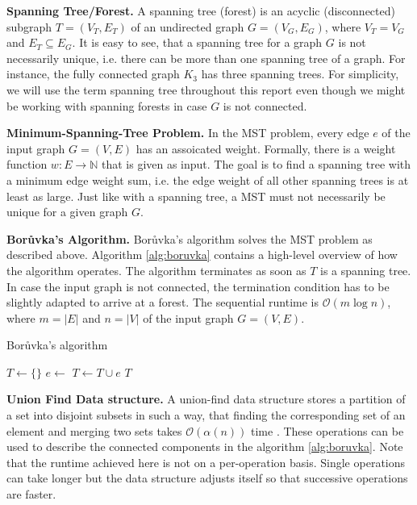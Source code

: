 \documentclass[letterpaper]{article}
\newcommand{\N}[0]{\mathbb{N}}
\newcommand{\bigoh}{\mathcal O}
\newcommand{\mypar}[1]{{\bf #1.}}
\begin{document}
\mypar{Spanning Tree/Forest}
A spanning tree (forest) is an acyclic (disconnected) subgraph $T = (V_T, E_T)$ of an undirected graph $G = (V_G, E_G)$,
where $V_T = V_G$ and $E_T \subseteq E_G$. It is easy to see, that a spanning tree for a graph $G$ is not necessarily
unique, i.e. there can be more than one spanning tree of a graph. For instance, the fully connected graph $K_3$ has
three spanning trees. For simplicity, we will use the term spanning tree throughout this report even though we might be
working with spanning forests in case $G$ is not connected.

\mypar{Minimum-Spanning-Tree Problem}
In the MST problem, every edge $e$ of the input graph $G = (V, E)$ has an assoicated weight. Formally, there is a weight
function $w : E \to \N$ that is given as input. The goal is to find a spanning tree with a minimum edge weight sum, i.e.
the edge weight of all other spanning trees is at least as large. Just like with a spanning tree, a MST must not
necessarily be unique for a given graph $G$.

\mypar{Bor\r{u}vka's Algorithm}
Bor\r{u}vka's algorithm \cite{boruuvka1926jistem, nevsetvril2001otakar} solves the MST problem as described above.
Algorithm \ref{alg:boruvka} contains a high-level overview of how the algorithm operates. The algorithm terminates as
soon as $T$ is a spanning tree. In case the input graph is not connected, the termination condition has to be slightly adapted to
arrive at a forest. The sequential runtime is $\bigoh(m \log n)$, where $m = |E|$ and $n = |V|$ of the input graph $G =
(V, E)$.

\begin{algorithm}[!t]
  \caption{Bor\r{u}vka's algorithm}
  \label{alg:boruvka}
  \begin{algorithmic}
    \State $T \gets \{ \}$
        \State $e \gets$ 
        \State $T \gets T \cup e$
      \EndFor
      \State {}
    \EndWhile
    \State \Return $T$
  \end{algorithmic}
\end{algorithm}

\mypar{Union Find Data structure}
A union-find data structure stores a partition of a set into disjoint subsets in such a way, that finding the
corresponding set of an element and merging two sets takes $\bigoh(\alpha(n))$ time \cite{efficiency_union_find}. These
operations can be used to describe the connected components in the algorithm \ref{alg:boruvka}. Note that the runtime
achieved here is not on a per-operation basis. Single operations can take longer but the data structure adjusts itself
so that successive operations are faster.
\end{document}
